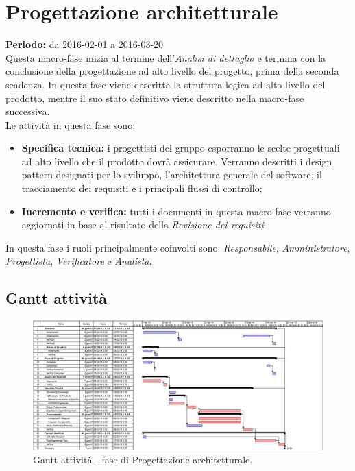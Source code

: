 \documentclass[a4paper]{report}
\begin{document}
		\section{Progettazione architetturale}
			\textbf{Periodo:} da 2016-02-01 a 2016-03-20 \\
			Questa macro-fase inizia al termine dell'\emph{Analisi di dettaglio} e termina con la conclusione 
			della progettazione ad alto livello del progetto, prima della seconda scadenza. In questa fase viene 
			descritta la struttura logica ad alto livello del prodotto, mentre il suo stato definitivo viene 
			descritto nella macro-fase successiva. \\
			Le attività in questa fase sono:
			\begin{itemize}
				\item \textbf{Specifica tecnica:} i progettisti del gruppo esporranno le scelte progettuali ad alto 
				livello che il prodotto dovrà assicurare. Verranno descritti i design pattern designati per lo sviluppo, 
				l'architettura generale del software, il tracciamento dei requisiti e i principali flussi di controllo;
				\item \textbf{Incremento e verifica:} tutti i documenti in questa macro-fase verranno aggiornati in base 
				al risultato della \emph{Revisione dei requisiti}.
			\end{itemize}
			In questa fase i ruoli principalmente coinvolti sono: \emph{Responsabile}, \emph{Amministratore},
			\emph{Progettista}, \emph{Verificatore} e  \emph{Analista}.

			\subsection{Gantt attività}
				\begin{figure}[H]
					\centering
					\includegraphics[scale=0.4]{GanttProgettazione}
					\caption{Gantt attività - fase di Progettazione architetturale.}
				\end{figure}
\end{document}

